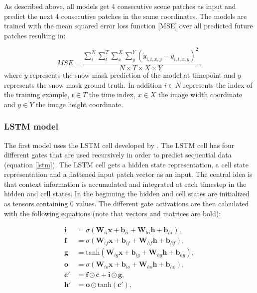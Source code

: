 \documentclass[12pt]{article}
\begin{document}
As described above, all models get 4 consecutive scene patches as input and predict the next 4 consecutive patches in the same coordinates. The models are trained with the mean squared error loss function [MSE] over all predicted future patches resulting in:

\begin{equation}
	MSE = \frac{\sum_{i}^{N} \sum_{t}^{T} \sum_{x}^{X} \sum_{y}^{Y} (\tilde{y}_{i, t, x, y} - y_{i, t, x, y})^2}{N \times T \times X \times Y },
\end{equation}
where $\tilde{y}$ represents the snow mask prediction of the model at timepoint and $y$ represents the snow mask ground truth. In addition $i\in N$ represents the index of the training example, $t \in T$ the time index, $x \in X$ the image width coordinate and $y \in Y $ the image height coordinate.  

\subsubsection{LSTM model}
The first model uses the LSTM cell developed by \citet{hochreiter1997long}. The LSTM cell has four different gates that are used recursively in order to predict sequential data (equation \ref{lstm}). The LSTM cell gets a hidden state representation, a cell state representation and a flattened input patch vector as an input. The central idea is that context information is accumulated and integrated at each timestep in the hidden and cell states. In the beginning the hidden and cell states are initialized as tensors containing 0 values. The different gate activations are then calculated with the following equations (note that vectors and matrices are bold):  


\begin{equation}
	\begin{aligned}
		\mathbf{i} &= \sigma(\mathbf{W}_{ii}\mathbf{x} + \mathbf{b}_{ii} + \mathbf{W}_{hi}\mathbf{h} + \mathbf{b}_{hi}), \\
		\mathbf{f} &= \sigma(\mathbf{W}_{if}\mathbf{x} + \mathbf{b}_{if} + \mathbf{W}_{hf}\mathbf{h} + \mathbf{b}_{hf}), \\
		\mathbf{g} &= \mathrm{tanh}(\mathbf{W}_{ig}\mathbf{x} + \mathbf{b}_{ig} + \mathbf{W}_{hg}\mathbf{h} + \mathbf{b}_{hg}), \\
		\mathbf{o} &= \sigma(\mathbf{W}_{io}\mathbf{x} + \mathbf{b}_{io} + \mathbf{W}_{ho}\mathbf{h} + \mathbf{b}_{ho}), \\
		\mathbf{c'} &= \mathbf{f} \odot \mathbf{c} + \mathbf{i} \odot \mathbf{g}, \\
		\mathbf{h'} &= \mathbf{o} \odot \mathrm{tanh}(\mathbf{c'}),
	\end{aligned}
	\label{lstm}
\end{equation}
\end{document}
